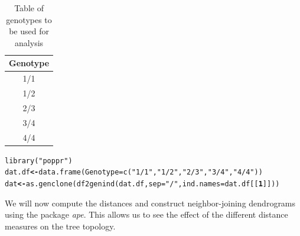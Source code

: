 \documentclass[letterpaper]{article}\usepackage[]{graphicx}\usepackage[]{color}
\makeatletter
\newcommand{\hlnum}[1]{\textcolor[rgb]{0.502,0,0.502}{\textbf{#1}}}%
\newcommand{\hlstr}[1]{\textcolor[rgb]{0.651,0.522,0}{#1}}%
\newcommand{\hlstd}[1]{\textcolor[rgb]{0,0,0}{#1}}%
\newcommand{\hlkwb}[1]{\textcolor[rgb]{0.502,0.502,0.753}{\textbf{#1}}}%
\newcommand{\hlkwc}[1]{\textcolor[rgb]{0,0.502,0.753}{#1}}%
\newcommand{\hlkwd}[1]{\textcolor[rgb]{0,0.267,0.4}{#1}}%
\newenvironment{kframe}{%
 \def\at@end@of@kframe{}%
 \ifinner\ifhmode%
  \def\at@end@of@kframe{\end{minipage}}%
  \begin{minipage}{\columnwidth}%
 \fi\fi%
 \def\FrameCommand##1{\hskip\@totalleftmargin \hskip-\fboxsep
 \colorbox{shadecolor}{##1}\hskip-\fboxsep
     \hskip-\linewidth \hskip-\@totalleftmargin \hskip\columnwidth}%
 \MakeFramed {\advance\hsize-\width
   \@totalleftmargin\z@ \linewidth\hsize
   \@setminipage}}%
 {\par\unskip\endMakeFramed%
 \at@end@of@kframe}
\newenvironment{knitrout}{}{} %
\makeatother
\begin{document}
\begin{table}[ht]
\centering
\begin{tabular}{c}
  \hline
Genotype \\ 
  \hline
1/1 \\ 
  1/2 \\ 
  2/3 \\ 
  3/4 \\ 
  4/4 \\ 
   \hline
\end{tabular}
\caption{Table of genotypes to be used for analysis} 
\end{table}

\begin{knitrout}
\color{fgcolor}\begin{kframe}
\begin{alltt}
\hlkwd{library}\hlstd{(}\hlstr{"poppr"}\hlstd{)}
\hlstd{dat.df} \hlkwb{<-} \hlkwd{data.frame}\hlstd{(}\hlkwc{Genotype} \hlstd{=} \hlkwd{c}\hlstd{(}\hlstr{"1/1"}\hlstd{,} \hlstr{"1/2"}\hlstd{,} \hlstr{"2/3"}\hlstd{,} \hlstr{"3/4"}\hlstd{,} \hlstr{"4/4"}\hlstd{))}
\hlstd{dat} \hlkwb{<-} \hlkwd{as.genclone}\hlstd{(}\hlkwd{df2genind}\hlstd{(dat.df,} \hlkwc{sep} \hlstd{=} \hlstr{"/"}\hlstd{,} \hlkwc{ind.names} \hlstd{= dat.df[[}\hlnum{1}\hlstd{]]))}
\end{alltt}
\end{kframe}
\end{knitrout}

We will now compute the distances and construct neighbor-joining dendrograms
using the package \textit{ape}. This allows us to see the effect of the
different distance measures on the tree topology.
\end{document}
